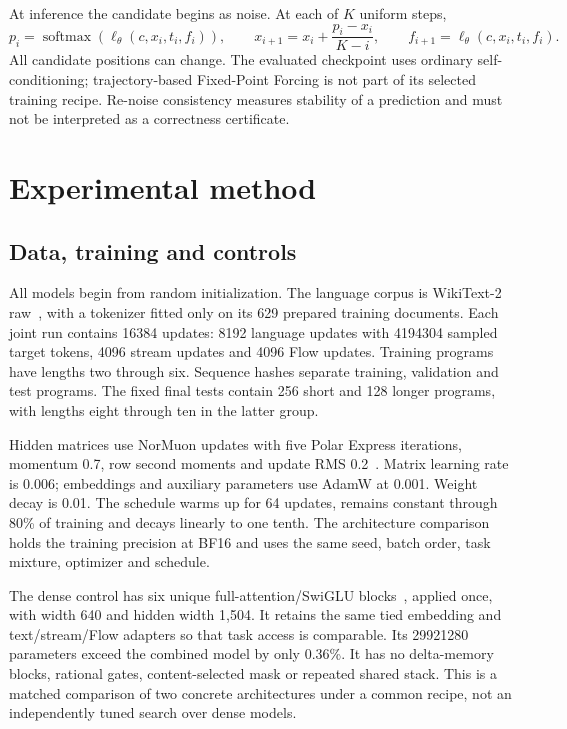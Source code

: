 \documentclass[11pt]{article}
\begin{document}
At inference the candidate begins as noise. At each of $K$ uniform steps,
\begin{equation}
 p_i=\operatorname{softmax}(\ell_\theta(c,x_i,t_i,f_i)),\qquad
 x_{i+1}=x_i+\frac{p_i-x_i}{K-i},\qquad f_{i+1}=\ell_\theta(c,x_i,t_i,f_i).
\end{equation}
All candidate positions can change. The evaluated checkpoint uses ordinary
self-conditioning; trajectory-based Fixed-Point Forcing is not part of its
selected training recipe. Re-noise consistency measures stability of a
prediction and must not be interpreted as a correctness certificate.

\section{Experimental method}
\subsection{Data, training and controls}
All models begin from random initialization. The language corpus is
WikiText-2 raw~\cite{wikitext}, with a tokenizer fitted only on its 629 prepared
training documents. Each joint run contains \num{16384} updates:
\num{8192} language updates with \num{4194304} sampled target tokens,
\num{4096} stream updates and \num{4096} Flow updates. Training programs have
lengths two through six. Sequence hashes separate training, validation and test
programs. The fixed final tests contain 256 short and 128 longer programs,
with lengths eight through ten in the latter group.

Hidden matrices use NorMuon updates with five Polar Express iterations,
momentum 0.7, row second moments and update RMS 0.2~\cite{pe,normuon}.
Matrix learning rate is 0.006; embeddings and auxiliary parameters use AdamW
at 0.001. Weight decay is 0.01. The schedule warms up for 64 updates, remains
constant through 80\% of training and decays linearly to one tenth. The
architecture comparison holds the training precision at BF16 and uses the
same seed, batch order, task mixture, optimizer and schedule.

The dense control has six unique full-attention/SwiGLU blocks~\cite{swiglu},
applied once, with width 640 and hidden width 1,504. It retains the same tied
embedding and text/stream/Flow adapters so that task access is comparable.
Its \num{29921280} parameters exceed the combined model by only 0.36\%.
It has no delta-memory blocks, rational gates, content-selected mask or
repeated shared stack. This is a matched comparison of two concrete
architectures under a common recipe, not an independently tuned search over
dense models.
\end{document}
